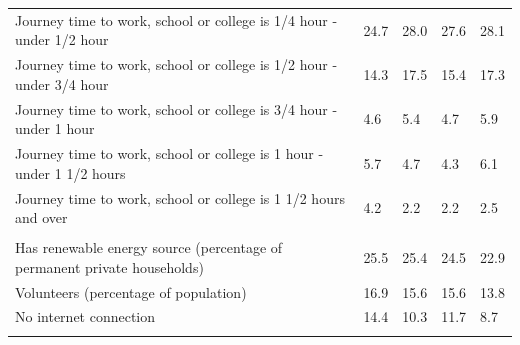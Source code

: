 \documentclass{article}
\begin{document}
\begin{table}[h]
\begin{tabular}{KTTTT}
Journey time to work, school or college is 1/4 hour - under 1/2 hour & 24.7& 28.0& 27.6& 28.1\\
Journey time to work, school or college is 1/2 hour - under 3/4 hour & 14.3& 17.5& 15.4& 17.3\\
Journey time to work, school or college is 3/4 hour - under 1 hour & 4.6& 5.4& 4.7& 5.9\\
Journey time to work, school or college is 1 hour - under 1 1/2 hours & 5.7& 4.7& 4.3& 6.1\\
Journey time to work, school or college is 1 1/2 hours and over & 4.2& 2.2& 2.2& 2.5\\
\hline
    \\ 
    \hline
Has renewable energy source (percentage of permanent private households) & 25.5& 25.4& 24.5& 22.9\\
    \hline
Volunteers (percentage of population) & 16.9& 15.6& 15.6& 13.8\\
    \hline
No internet connection& 14.4& 10.3& 11.7&  8.7\\
\hline
\end{tabular}
\end{table}
\end{document}
